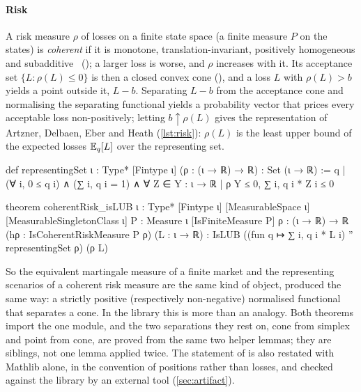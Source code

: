 \documentclass[11pt]{article}
\begin{document}
\paragraph{Risk}
A risk measure $\rho$ of losses on a finite state space (a finite measure $P$ on the states) is \emph{coherent} if it is monotone, translation-invariant,
positively homogeneous and subadditive~\cite{ADEH1999} (); a larger loss is worse, and
$\rho$ increases with it. Its acceptance set $\{L:\rho(L)\le0\}$ is then a
closed convex cone (), and a loss $L$ with $\rho(L)>b$ yields a point outside it,
$L-b$. Separating $L-b$ from the acceptance cone and normalising the separating functional
yields a probability vector that prices every acceptable loss non-positively; letting
$b\uparrow\rho(L)$ gives the representation of Artzner, Delbaen, Eber and Heath
(\cref{lst:risk}): $\rho(L)$ is the least upper bound of the expected losses $\mathbb{E}_q[L]$ over the
representing set.

\begin{leancode}[caption={The coherent-risk representation on a finite state space (\texttt{RiskMeasures/AcceptanceSet}).},label=lst:risk]
def representingSet {ι : Type*} [Fintype ι] (ρ : (ι → ℝ) → ℝ) :
    Set (ι → ℝ) :=
  {q | (∀ i, 0 ≤ q i) ∧ (∑ i, q i = 1) ∧
    ∀ Z ∈ {Y : ι → ℝ | ρ Y ≤ 0}, ∑ i, q i * Z i ≤ 0}

theorem coherentRisk_isLUB {ι : Type*} [Fintype ι] [MeasurableSpace ι]
    [MeasurableSingletonClass ι] {P : Measure ι} [IsFiniteMeasure P]
    {ρ : (ι → ℝ) → ℝ} (hρ : IsCoherentRiskMeasure P ρ) (L : ι → ℝ) :
    IsLUB ((fun q ↦ ∑ i, q i * L i) '' representingSet ρ) (ρ L)
\end{leancode}

So the equivalent martingale measure of a finite market and the representing scenarios of a coherent risk
measure are the same kind of object, produced the same way: a strictly positive (respectively
non-negative) normalised functional that separates a cone. In the library this is more than an analogy.
Both theorems import the one module, and the two separations they rest on, cone from simplex and point
from cone, are proved from the same two helper lemmas; they are siblings, not one lemma applied twice. The statement of  is also
restated with Mathlib alone, in the convention of positions rather than losses, and checked against the library by an external tool
(\cref{sec:artifact}).
\end{document}
